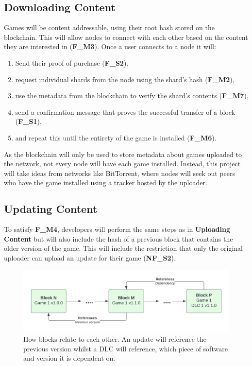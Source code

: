 \subsection*{Downloading Content}

Games will be content addressable, using their root hash stored on the blockchain. This will allow nodes to connect with each other based on the content they are interested in (\textbf{F\_M3}). Once a user connects to a node it will:

\begin{enumerate}
  \item Send their proof of purchase (\textbf{F\_S2}).
  \item request individual shards from the node using the shard's hash (\textbf{F\_M2}),
  \item use the metadata from the blockchain to verify the shard's contents (\textbf{F\_M7}),
  \item send a confirmation message that proves the successful transfer of a block (\textbf{F\_S1}), 
  \item and repeat this until the entirety of the game is installed (\textbf{F\_M6}).
\end{enumerate}

\noindent As the blockchain will only be used to store metadata about games uploaded to the network, not every node will have each game installed. Instead, this project will take ideas from networks like BitTorrent, where nodes will seek out peers who have the game installed using a tracker hosted by the uploader.

\subsection*{Updating Content}

To satisfy \textbf{F\_M4}, developers will perform the same steps as in \textbf{Uploading Content} but will also include the hash of a previous block that contains the older version of the game. This will include the restriction that only the original uploader can upload an update for their game (\textbf{NF\_S2}).

\begin{figure}[ht]
  \centering
  \includegraphics[width=.85\textwidth]{assets/images/diagrams/software.png}
  \caption{How blocks relate to each other. An update will reference the previous version whilst a DLC will reference, which piece of software and version it is dependent on.}
\end{figure}

